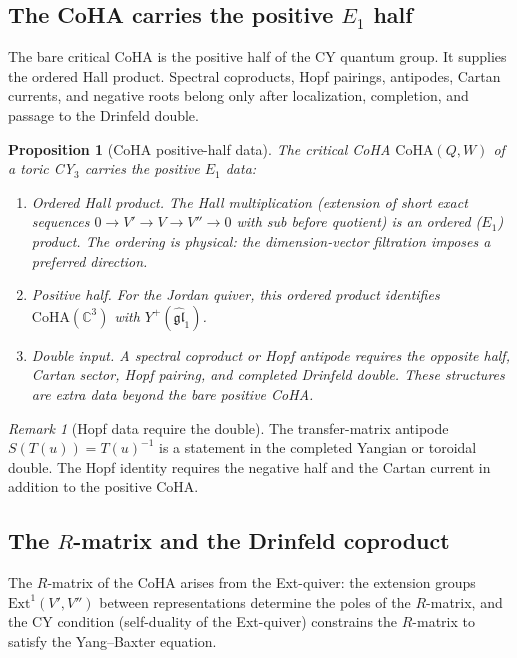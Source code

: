 \documentclass[11pt]{article}
\theoremstyle{plain}
\newtheorem{proposition}[theorem]{Proposition}
\theoremstyle{definition}
\theoremstyle{remark}
\newtheorem{remark}[theorem]{Remark}
\newcommand{\fgl}{\mathfrak{gl}}
\newcommand{\bC}{\mathbb{C}}
\newcommand{\Eone}{E_1}
\newcommand{\CoHA}{\mathrm{CoHA}}
\newcommand{\Ext}{\mathrm{Ext}}
\begin{document}
\subsection{The CoHA carries the positive $\Eone$ half}

The bare critical CoHA is the positive half of the CY quantum group.
It supplies the ordered Hall product. Spectral coproducts, Hopf
pairings, antipodes, Cartan currents, and negative roots belong only
after localization, completion, and passage to the Drinfeld double.

\begin{proposition}[CoHA positive-half data]
\label{prop:v3-qg-coha-hopf}
The critical CoHA $\CoHA(Q, W)$ of a toric CY$_3$ carries the
positive $\Eone$ data:
\begin{enumerate}[label=\textup{(H\arabic*)}]
 \item \emph{Ordered Hall product.}  The Hall multiplication
 (extension of short exact sequences $0 \to V' \to V \to V'' \to 0$
 with sub before quotient) is an ordered ($\Eone$) product.  The
 ordering is physical: the dimension-vector filtration imposes a
 preferred direction.
 \item \emph{Positive half.}  For the Jordan quiver, this ordered
 product identifies $\CoHA(\bC^3)$ with
 $Y^+(\widehat{\fgl}_1)$.
 \item \emph{Double input.}  A spectral coproduct or Hopf antipode
 requires the opposite half, Cartan sector, Hopf pairing, and
 completed Drinfeld double. These structures are extra data beyond
 the bare positive CoHA.
\end{enumerate}
\end{proposition}

\begin{remark}[Hopf data require the double]
\label{rem:v3-qg-antipode}
The transfer-matrix antipode $S(T(u))=T(u)^{-1}$ is a statement in
the completed Yangian or toroidal double. The Hopf identity requires
the negative half and the Cartan current in addition to the positive
CoHA.
\end{remark}

\subsection{The $R$-matrix and the Drinfeld coproduct}

The $R$-matrix of the CoHA arises from the Ext-quiver: the
extension groups $\Ext^1(V', V'')$ between representations
determine the poles of the $R$-matrix, and the CY condition
(self-duality of the Ext-quiver) constrains the $R$-matrix
to satisfy the Yang--Baxter equation.
\end{document}
